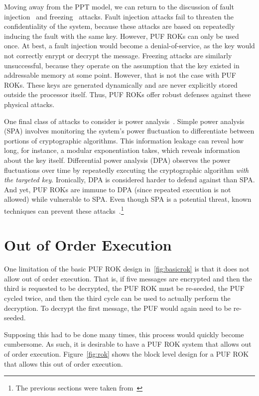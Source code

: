 Moving away from the PPT model, we can return to the discussion of fault
injection~\cite{rsapub,pertrsa,insecrsa,rsaltr,fault} and freezing~\cite{freezing}
attacks.  Fault injection attacks fail to threaten the confidentiality of the system,
because these attacks are based on repeatedly inducing the fault with the same key.  However, PUF ROKs can
only be used once.  At best, a fault injection would become a denial-of-service, as the key would not
correctly enrypt or decrypt the message.  Freezing attacks are similarly unsuccessful, because they operate
on the assumption that the key existed in addressable memory at some point.  However, that is not the case
with PUF ROKs.  These keys are generated dynamically and are never explicitly stored outside the processor
itself.  Thus, PUF ROKs offer robust defenses against these physical attacks.

One final class of attacks to consider is power analysis~\cite{dpa}.  Simple power analysis (SPA) involves
monitoring the system's power fluctuation to differentiate between portions of cryptographic algorithms.
This information leakage can reveal how long, for instance, a modular exponentiation takes, which reveals
information about the key itself.  Differential power analysis (DPA) observes the power fluctuations over
time by repeatedly executing the cryptographic algorithm \emph{with the targeted key}.  Ironically, DPA
is considered harder to defend against than SPA.  And yet, PUF ROKs are immune to DPA (since repeated execution
is not allowed) while vulnerable to SPA.  Even though SPA is a potential threat, known techniques can prevent
these attacks~\cite{sidechan}.\footnote{The previous sections were taken from~\cite{PUFROK}}

\section{Out of Order Execution}
One limitation of the basic PUF ROK design in~\ref{fig:basicrok} is that it does not allow out of order execution. That is,
if five messages are encrypted and then the third is requested to be decrypted, the PUF ROK must be re-seeded, the PUF
cycled twice, and then the third cycle can be used to actually perform the decryption. To decrypt the first message, the
PUF would again need to be re-seeded. 

Supposing this had to be done many times, this process would quickly become cumbersome. As such, it is desirable to
have a PUF ROK system that allows out of order execution. Figure~\ref{fig:rok} shows the block level design for a PUF
ROK that allows this out of order execution.


